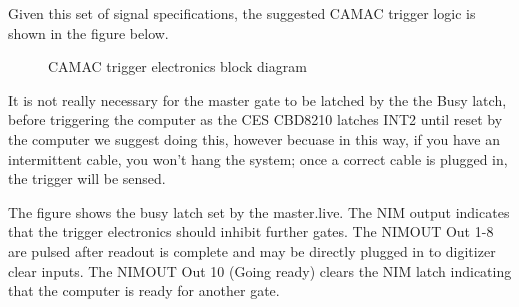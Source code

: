 	 Given this set of signal specifications, the suggested CAMAC	trigger logic is shown in the figure below.
	 \begin{figure}[htb]
	    \caption{CAMAC trigger electronics block diagram}

	 \end{figure}
	 
	 It is not really necessary for the master gate to be latched by the the Busy latch,
	 before triggering the computer as the CES CBD8210 latches INT2 until reset by the
	 computer we suggest doing this, however becuase in this way, if you have an intermittent
	 cable, you won't hang the system; once a correct cable is plugged in, the trigger
	 will be sensed.
	 
	 The figure shows the busy latch set by the master.live.  The NIM output indicates 
	 that the trigger electronics should inhibit further gates.  
	 The NIMOUT Out 1-8 are pulsed after readout is complete and may be 
	 directly plugged in to digitizer 
	 clear inputs.  The NIMOUT Out 10 (Going ready) clears the NIM latch indicating that the computer
	 is ready for another gate.
	 
